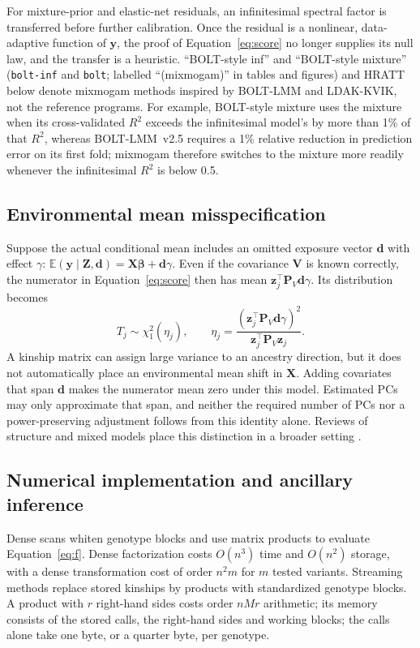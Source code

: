 \documentclass[11pt]{article}
\newcommand{\y}{\mathbf{y}}
\newcommand{\z}{\mathbf{z}}
\newcommand{\X}{\mathbf{X}}
\newcommand{\V}{\mathbf{V}}
\newcommand{\Pm}{\mathbf{P}}
\newcommand{\E}{\mathbb{E}}
\newcommand{\code}[1]{\texttt{#1}}
\begin{document}
For mixture-prior and elastic-net residuals, an infinitesimal spectral
factor is transferred before further calibration. Once the residual is
a nonlinear, data-adaptive function of $\y$, the proof of
Equation~\eqref{eq:score} no longer supplies its null law, and the
transfer is a heuristic. ``BOLT-style inf'' and ``BOLT-style mixture''
(\code{bolt-inf} and \code{bolt}; labelled ``(mixmogam)'' in tables and
figures) and HRATT below denote mixmogam methods inspired by BOLT-LMM and
LDAK-KVIK, not the reference programs. For example, BOLT-style mixture
uses the mixture when its cross-validated $R^2$ exceeds the infinitesimal
model's by more than 1\% of that $R^2$, whereas BOLT-LMM~v2.5 requires a
1\% relative reduction in prediction error on its first fold; mixmogam
therefore switches to the mixture more readily whenever the infinitesimal
$R^2$ is below 0.5.

\subsection{Environmental mean misspecification}
\label{sec:environment}

Suppose the actual conditional mean includes an omitted exposure vector
$\mathbf d$ with effect $\gamma$:
$\E(\y\mid\mathbf Z,\mathbf d)=\X\boldsymbol\beta+\mathbf d\gamma$.
Even if the covariance $\V$ is known correctly, the numerator in
Equation~\eqref{eq:score} then has mean
$\z_j^\top\Pm_V\mathbf d\gamma$. Its distribution becomes
\begin{equation}
 T_j\sim\chi^2_1(\eta_j),\qquad
 \eta_j=\frac{(\z_j^\top\Pm_V\mathbf d\gamma)^2}
                  {\z_j^\top\Pm_V\z_j}.
 \label{eq:noncentral}
\end{equation}
A kinship matrix can assign large variance to an ancestry direction,
but it does not automatically place an environmental mean shift in
$\X$. Adding covariates that span $\mathbf d$ makes the numerator mean
zero under this model. Estimated PCs may only approximate that span,
and neither the required number of PCs nor a power-preserving adjustment
follows from this identity alone. Reviews of structure and mixed models
place this distinction in a broader setting
\citep{price2010,sul2018,yang2014}.

\subsection{Numerical implementation and ancillary inference}

Dense scans whiten genotype blocks and use matrix products to evaluate
Equation~\eqref{eq:f}. Dense factorization costs $O(n^3)$ time and
$O(n^2)$ storage, with a dense transformation cost of order $n^2m$ for
$m$ tested variants. Streaming methods replace stored kinships by
products with standardized genotype blocks. A product with $r$ right-hand
sides costs order $nMr$ arithmetic; its memory consists of the stored
calls, the right-hand sides and working blocks; the calls alone take one
byte, or a quarter byte, per genotype.
\end{document}
